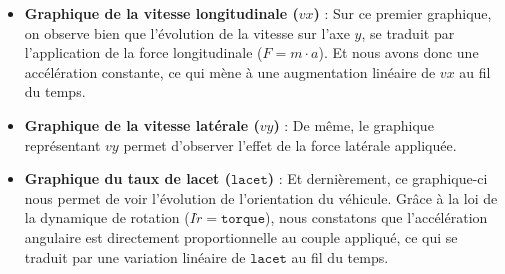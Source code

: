 \documentclass[a4paper,12pt]{report}
\begin{document}
    \begin{itemize}
        \item \textbf{Graphique de la vitesse longitudinale ($vx$)} : Sur ce premier graphique, on observe bien que l'évolution de la vitesse sur l'axe $y$, se traduit par l'application de la force longitudinale ($ F = m \cdot a $). Et nous avons donc une accélération constante, ce qui mène à une augmentation linéaire de $vx$ au fil du temps.

        \item \textbf{Graphique de la vitesse latérale ($vy$)} : De même, le graphique représentant $vy$ permet d'observer l'effet de la force latérale appliquée.

        \item \textbf{Graphique du taux de lacet ({$\texttt{lacet}$})} : Et dernièrement, ce graphique-ci nous permet de voir l'évolution de l'orientation du véhicule. Grâce à la loi de la dynamique de rotation ($I\dot{r} = \texttt{torque}$), nous constatons que l'accélération angulaire est directement proportionnelle au couple appliqué, ce qui se traduit par une variation linéaire de $\texttt{lacet}$ au fil du temps.

    \end{itemize}
\end{document}
